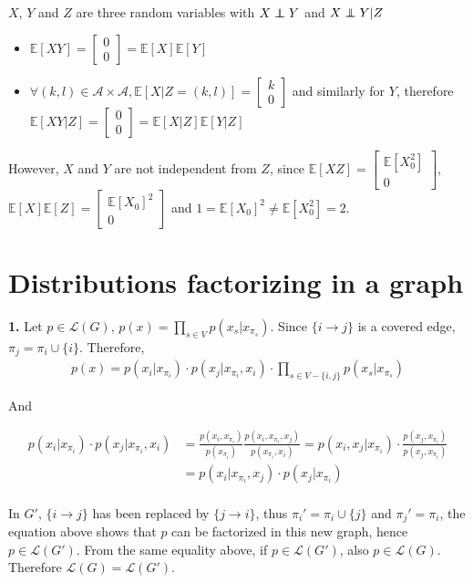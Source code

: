 \documentclass[11pt, oneside]{amsart}   	%
\newcommand\indep{\protect\mathpalette{\protect\indeP}{\perp}}
\def\indeP#1#2{\mathrel{\rlap{$#1#2$}\mkern2mu{#1#2}}}
\begin{document}
 $X$, $Y$ and $Z$ are three random variables with $X \indep Y$ and $ X \indep Y | Z$
 \begin{itemize}
\item  $\mathbb{E}[XY] =  \begin{bmatrix} 0 \\ 0 \end{bmatrix} = \mathbb{E}[X]\mathbb{E}[Y]$
\item $\forall (k,l) \in \mathcal{A}\times\mathcal{A},  \mathbb{E}[X|Z=(k,l)] =  \begin{bmatrix} k \\ 0 \end{bmatrix}$ and similarly for $Y$, therefore $\mathbb{E}[XY|Z] =  \begin{bmatrix} 0 \\ 0 \end{bmatrix} = \mathbb{E}[X|Z]\mathbb{E}[Y|Z]$
 \end{itemize}
 However, $X$ and $Y$ are not independent from $Z$, since  $\mathbb{E}[XZ] = \begin{bmatrix} \mathbb{E}[X_0^2] \\ 0 \end{bmatrix}$, $\mathbb{E}[X]\mathbb{E}[Z] = \begin{bmatrix} \mathbb{E}[X_0]^2 \\ 0 \end{bmatrix}$ and $1 = \boxed{\mathbb{E}[X_0]^2 \neq \mathbb{E}[X_0^2] }= 2$.
 \vfill
 
 \clearpage
 \section{Distributions factorizing in a graph}
  \vfill
 \textbf{1.} Let $p\in\mathcal{L}(G)$, $p(x) = \prod_{s\in V} p(x_s|x_{\pi_s})$. Since $\{i\rightarrow j\}$ is a covered edge,  $\pi_j = \pi_i \cup \{i\}$. Therefore,
 \begin{align*}
 p(x) = p(x_i|x_{\pi_i})\cdot p(x_j|x_{\pi_i}, x_i) \cdot\prod_{s\in V-\{ i, j \}} p(x_s|x_{\pi_s})
 \end{align*}
 
 And 
 
 \begin{align*}
 p(x_i|x_{\pi_i})\cdot p(x_j|x_{\pi_i}, x_i) &= \frac{p(x_i, x_{\pi_i})}{p(x_{\pi_i})} \frac{p(x_i, x_{\pi_i}, x_j)}{p(x_{\pi_i}, x_i)} =p(x_i,  x_j |x_{\pi_i})\cdot \frac{p(x_j, x_{\pi_i})}{p(x_j, x_{\pi_i})}\\[+5pt]
 & = p(x_i | x_{\pi_i}, x_j)\cdot p(x_j|x_{\pi_i})
 \end{align*}
 \\
 In $G'$, $\{i\rightarrow j\}$ has been replaced by $\{j\rightarrow i\}$, thus $\pi_i' = \pi_i \cup \{j\}$ and $\pi_j' = \pi_i $, the equation above shows that $p$ can be factorized in this new graph, hence $p\in \mathcal{L}(G')$. From the same equality above, if $p\in \mathcal{L}(G')$, also $p\in \mathcal{L}(G)$. Therefore $\boxed{ \mathcal{L}(G) =  \mathcal{L}(G')}$.
 \vfill
 
\end{document}

